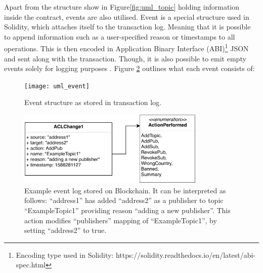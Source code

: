 Apart from the structure show in Figure\ref{fig:uml_topic} holding information inside the contract, events are also utilised. Event is a special structure used in Solidity, which attaches itself to the transaction log. Meaning that it is possible to append information such as a user-specified reason or timestamps to all operations. This is then encoded in Application Binary Interface (ABI)\footnote{Encoding type used in Solidity: https://solidity.readthedocs.io/en/latest/abi-spec.html} JSON and sent along with the transaction. Though, it is also possible to emit empty events solely for logging purposes \citep{dannen2017introducing}.  Figure \ref{fig:uml_event} outlines what each event consists of:

\begin{figure}[h]
    \centering
    \texttt{[image: uml\_event]}
    \caption{Event structure as stored in transaction log.}
    \label{fig:uml_event}
\end{figure}
\begin{figure}[h]
    \centering
    \includegraphics[width=0.8\textwidth]{report/img/uml_event_example.pdf}
    \caption{Example event log stored on Blockchain. It can be interpreted as follows: ``address1'' has added ``address2'' as a publisher to topic ``ExampleTopic1'' providing reason ``adding a new publisher''. This action modifies ``publishers'' mapping of ``ExampleTopic1'', by setting ``address2'' to true.}
    \label{fig:uml_event}
\end{figure}


